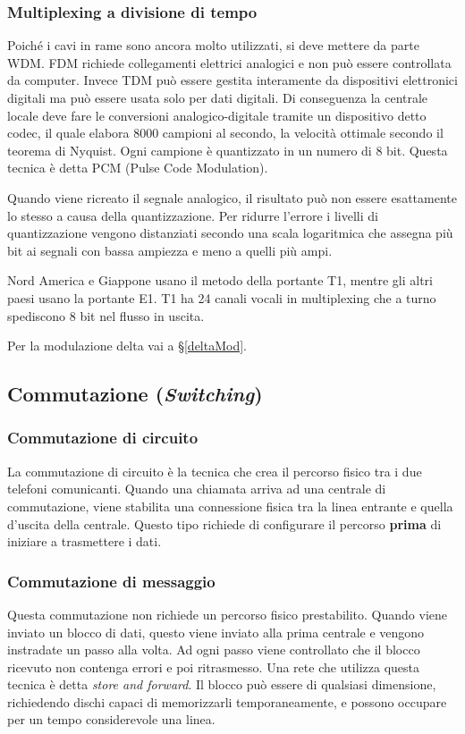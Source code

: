 \subsubsection{Multiplexing a divisione di tempo}
Poiché i cavi in rame sono ancora molto utilizzati, si deve mettere da parte WDM. 
FDM richiede collegamenti elettrici analogici e non può essere controllata da computer.
Invece TDM può essere gestita interamente da dispositivi elettronici digitali ma può essere usata solo per dati digitali.
Di conseguenza la centrale locale deve fare le conversioni analogico-digitale tramite un dispositivo detto codec,
il quale elabora 8000 campioni al secondo, la velocità ottimale secondo il teorema di Nyquist.
Ogni campione è quantizzato in un numero di 8 bit.
Questa tecnica è detta PCM (Pulse Code Modulation). 

Quando viene ricreato il segnale analogico, il risultato può non essere esattamente lo stesso a causa della quantizzazione.
Per ridurre l'errore i livelli di quantizzazione vengono distanziati secondo una scala logaritmica che assegna più bit ai segnali con bassa ampiezza e meno a quelli più ampi.

Nord America e Giappone usano il metodo della portante T1, mentre gli altri paesi usano la portante E1.
T1 ha 24 canali vocali in multiplexing che a turno spediscono 8 bit nel flusso in uscita.

Per la modulazione delta vai a §\ref{deltaMod}.


\subsection{Commutazione (\textit{Switching})}

\subsubsection{Commutazione di circuito}
La commutazione di circuito è la tecnica che crea il percorso fisico tra i due telefoni comunicanti. 
Quando una chiamata arriva ad una centrale di commutazione, viene stabilita una connessione fisica tra la linea entrante e quella d'uscita della centrale.
Questo tipo richiede di configurare il percorso \textbf{prima} di iniziare a trasmettere i dati.

\subsubsection{Commutazione di messaggio}
Questa commutazione non richiede un percorso fisico prestabilito. 
Quando viene inviato un blocco di dati, questo viene inviato alla prima centrale e vengono instradate un passo alla volta. 
Ad ogni passo viene controllato che il blocco ricevuto non contenga errori e poi ritrasmesso.
Una rete che utilizza questa tecnica è detta \textit{store and forward}.
Il blocco può essere di qualsiasi dimensione, richiedendo dischi capaci di memorizzarli temporaneamente, e possono occupare per un tempo considerevole una linea.

